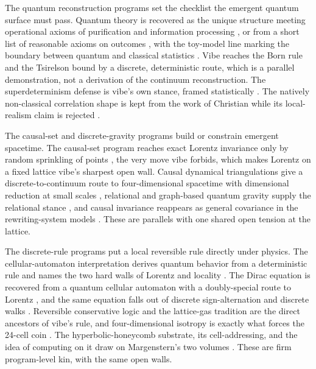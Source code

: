 The quantum reconstruction programs set the checklist the emergent quantum surface must pass. Quantum theory is recovered as the unique structure meeting operational axioms of purification and information processing \cite{chiribella2011}, or from a short list of reasonable axioms on outcomes \cite{hardy2001, masanes2011}, with the toy-model line marking the boundary between quantum and classical statistics \cite{spekkens2007}. Vibe reaches the Born rule and the Tsirelson bound by a discrete, deterministic route, which is a parallel demonstration, not a derivation of the continuum reconstruction. The superdeterminism defense is vibe's own stance, framed statistically \cite{hossenfelder2020}. The natively non-classical correlation shape is kept from the work of Christian while its local-realism claim is rejected \cite{christian2007}.

The causal-set and discrete-gravity programs build or constrain emergent spacetime. The causal-set program reaches exact Lorentz invariance only by random sprinkling of points \cite{bombelli1987, dowker2004}, the very move vibe forbids, which makes Lorentz on a fixed lattice vibe's sharpest open wall. Causal dynamical triangulations give a discrete-to-continuum route to four-dimensional spacetime with dimensional reduction at small scales \cite{ambjorn2004}, relational and graph-based quantum gravity supply the relational stance \cite{rovelli1996, konopka2008}, and causal invariance reappears as general covariance in the rewriting-system models \cite{gorard2020}. These are parallels with one shared open tension at the lattice.

The discrete-rule programs put a local reversible rule directly under physics. The cellular-automaton interpretation derives quantum behavior from a deterministic rule and names the two hard walls of Lorentz and locality \cite{thooft2016}. The Dirac equation is recovered from a quantum cellular automaton with a doubly-special route to Lorentz \cite{dariano2014}, and the same equation falls out of discrete sign-alternation and discrete walks \cite{kauffman1996, ord2002, nottale1992}. Reversible conservative logic and the lattice-gas tradition are the direct ancestors of vibe's rule, and four-dimensional isotropy is exactly what forces the 24-cell coin \cite{fredkin1982, frisch1986, dhumieres1986, kari2005}. The hyperbolic-honeycomb substrate, its cell-addressing, and the idea of computing on it draw on Margenstern's two volumes \cite{margenstern2007vol1, margenstern2008vol2}. These are firm program-level kin, with the same open walls.

